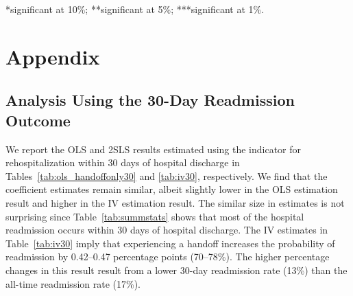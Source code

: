 \documentclass[final,12pt, notitlepage]{article}
\begin{document}
\begin{singlespace}
\begin{table}[H]
\begin{threeparttable}
\begin{tablenotes}
	*significant at 10\%; **significant at 5\%; ***significant at 1\%.
	\end{tablenotes}
\end{threeparttable}
\end{table}




\newpage
\section{Appendix}

\subsection{Analysis Using the 30-Day Readmission Outcome}
\label{appendix:hosp30}

We report the OLS and 2SLS results estimated using the indicator for rehospitalization within 30 days of hospital discharge in Tables~\ref{tab:ols_handoffonly30} and \ref{tab:iv30}, respectively.
We find that the coefficient estimates remain similar, albeit slightly lower in the OLS estimation result and higher in the IV estimation result.
The similar size in estimates is not surprising since Table~\ref{tab:summstats} shows that most of the hospital readmission occurs within 30 days of hospital discharge.
The IV estimates in Table~\ref{tab:iv30} imply that experiencing a handoff increases the probability of readmission by 0.42--0.47 percentage points (70--78\%).
The higher percentage changes in this result result from a lower 30-day readmission rate (13\%) than the all-time readmission rate (17\%).


\end{singlespace}
\end{document}

